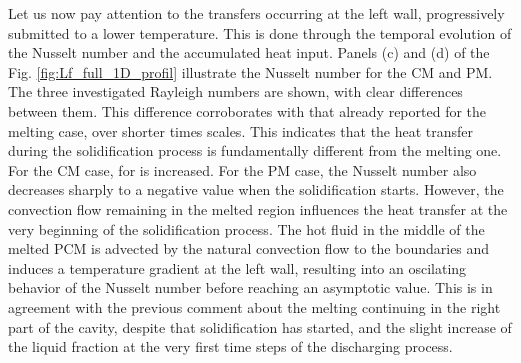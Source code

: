 Let us now pay attention to the transfers occurring at the left wall, progressively submitted to a lower temperature. 
This is done through the temporal evolution of the Nusselt number and the accumulated heat input.     
Panels (c) and (d) of the Fig. \ref{fig:Lf_full_1D_profil} illustrate the Nusselt number for the CM and PM.  
The three investigated Rayleigh numbers are shown, with clear differences between them. This difference corroborates with that already reported for the melting case, over shorter times scales.   This indicates that the heat transfer during the solidification process is fundamentally different from the melting one.
For the CM case, for   is increased. 
For the PM case, the Nusselt number also decreases sharply to a negative value when the solidification starts.
However, the convection flow remaining in the melted region influences the heat transfer at the very beginning of the solidification process.
The hot fluid in the middle of the melted PCM is advected by the natural convection flow to the boundaries and induces a temperature gradient at the left wall, resulting into an oscilating behavior of the Nusselt number before reaching  an asymptotic value.
This is in agreement with the previous comment about the melting continuing in the right part of the cavity, despite that solidification has started, and the slight increase of the liquid fraction at the very first time steps of the discharging process.



